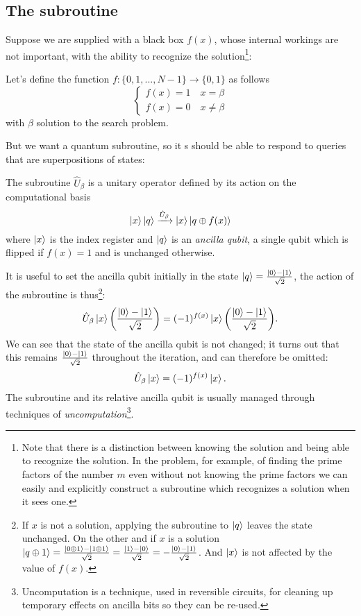 \subsection{The subroutine}\label{sec:subroutine}
Suppose we are supplied with a black box $f(x)$, whose internal workings are not important, with the ability to recognize the solution\footnote{Note that there is a distinction between knowing the solution and being able to recognize the solution. In the problem, for example, of finding the prime factors of the number $m$ even without not knowing the prime factors we can easily and explicitly construct a subroutine which recognizes a solution when it sees one.}:
\begin{defn}
Let's define the function $f: \{0,1,...,N-1\} \rightarrow \{0,1\}$ as follows
\begin{equation*}
    \begin{cases}
f(x) = 1   \quad  x=\beta \\
f(x) = 0   \quad x\neq\beta
\end{cases}
\end{equation*}
with $\beta$ solution to the search problem.
\end{defn}
But we want a quantum subroutine, so it s should be able to respond to queries that are superpositions of states:
\begin{defn}
The subroutine $\hat{U}_\beta$ is a unitary operator defined by its action on the computational basis
\begin{equation*}
    \ket{x}\ket{q} \xrightarrow{\hat{U}_\beta} \ket{x} \ket{q \oplus f(x)}
\end{equation*}
where $\ket{x}$ is the index register and $\ket{q}$ is an \emph{ancilla qubit}, a single qubit which is flipped if $f(x) = 1$ and is unchanged otherwise.
\end{defn}

It is useful to set the ancilla qubit initially in the state $\ket{q} = \frac{\ket{0}-\ket{1}}{\sqrt{2}}$, the action of the subroutine is thus\footnote{If $x$ is not a solution, applying the subroutine to $\ket{q}$ leaves the state unchanged. On the other and if $x$ is a solution $\ket{q \oplus 1} = \frac{\ket{0 \oplus 1} - \ket{1 \oplus 1}}{\sqrt{2}} = \frac{\ket{1}-\ket{0}}{\sqrt{2}} = - \frac{\ket{0}-\ket{1}}{\sqrt{2}}$. And $\ket{x}$ is not affected by the value of $f(x)$.}:
\begin{equation*}
    \hat{U}_\beta \ket{x} \biggl(\frac{\ket{0}-\ket{1}}{\sqrt{2}}\biggr) = (-1)^{f(x)} \ket{x} \biggl(\frac{\ket{0}-\ket{1}}{\sqrt{2}}\biggr).
\end{equation*}
We can see that the state of the ancilla qubit is not changed; it turns out that this remains  $\frac{\ket{0}-\ket{1}}{\sqrt{2}}$ throughout the iteration, and can therefore be omitted:
\begin{equation*}
    \hat{U}_\beta \ket{x} = (-1)^{f(x)} \ket{x}.
\end{equation*}
The subroutine and its relative ancilla qubit is usually managed through techniques of \emph{uncomputation}\footnote{Uncomputation is a technique, used in reversible circuits, for cleaning up temporary effects on ancilla bits so they can be re-used.}.

